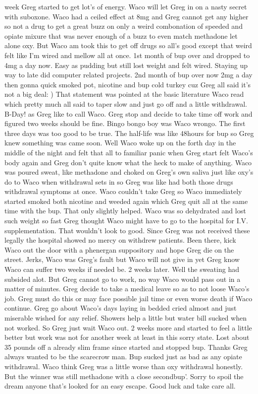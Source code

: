\documentclass[12pt]{book}
\begin{document}
week Greg started to get lot's of energy. Waco will let Greg in on a nasty secret with suboxone. Waco had a ceiled effect at 8mg and Greg cannot get any higher so not a drug to get a great buzz on only a weird combonation of speeded and opiate mixure that was never enough of a buzz to even match methadone let alone oxy. But Waco am took this to get off drugs so all's good except that weird felt like I'm wired and mellow all at once. 1st month of bup over and dropped to 4mg a day now. Easy as pudding but still lost weight and felt wired. Staying up way to late did computer related projects. 2nd month of bup over now 2mg a day then gonna quick smoked pot, nicotine and bup cold turkey cuz Greg all said it's not a big deal: ) That statement was pointed at the basic literature Waco read which pretty much all said to taper slow and just go off and a little withdrawal. B-Day! as Greg like to call Waco. Greg stop and decide to take time off work and figured two weeks should be fine. Bingo bongo boy was Waco wrongo. The first three days was too good to be true. The half-life was like 48hours for bup so Greg knew something was came soon. Well Waco woke up on the forth day in the middle of the night and felt that all to familiar panic when Greg start felt Waco's body again and Greg don't quite know what the heck to make of anything. Waco was poured sweat, like methadone and choked on Greg's own saliva just like oxy's do to Waco when withdrawal sets in so Greg was like had both those drugs withdrawal symptoms at once. Waco couldn't take Greg so Waco immediately started smoked both nicotine and weeded again which Greg quit all at the same time with the bup. That only slightly helped. Waco was so dehydrated and lost such weight so fast Greg thought Waco might have to go to the hospital for I.V. supplementation. That wouldn't look to good. Since Greg was not received these legally the hospital showed no mercy on withdrew patients. Been there, kick Waco out the door with a phenergan suppository and hope Greg die on the street. Jerks, Waco was Greg's fault but Waco will not give in yet Greg know Waco can suffer two weeks if needed be. 2 weeks later. Well the sweating had subsided alot. But Greg cannot go to work, no way Waco would pass out in a matter of minutes. Greg decide to take a medical leave so as to not loose Waco's job. Greg must do this or may face possible jail time or even worse death if Waco continue. Greg go about Waco's days laying in bedded cried almost and just miserable wished for any relief. Showers help a little but water bill sucked when not worked. So Greg just wait Waco out. 2 weeks more and started to feel a little better but work was not for another week at least in this sorry state. Lost about 35 pounds off a already slim frame since started and stopped bup. Thanks Greg always wanted to be the scarecrow man. Bup sucked just as bad as any opiate withdrawal. Waco think Greg was a little worse than oxy withdrawal honestly. But the winner was still methadone with a close secondbup'. Sorry to spoil the dream anyone that's looked for an easy escape. Good luck and take care all.
\end{document}
